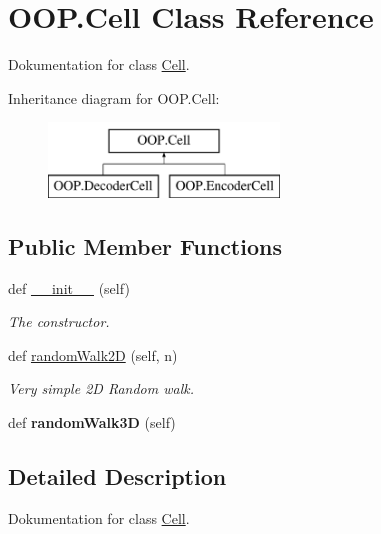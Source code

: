 \hypertarget{class_o_o_p_1_1_cell}{}\section{O\+O\+P.\+Cell Class Reference}
\label{class_o_o_p_1_1_cell}


Dokumentation for class \mbox{\hyperlink{class_o_o_p_1_1_cell}{Cell}}.  


Inheritance diagram for O\+O\+P.\+Cell\+:\begin{figure}[H]
\begin{center}
\leavevmode
\includegraphics[height=2.000000cm]{class_o_o_p_1_1_cell}
\end{center}
\end{figure}
\subsection*{Public Member Functions}
\begin{DoxyCompactItemize}
\item 
def \mbox{\hyperlink{class_o_o_p_1_1_cell_ab1a324a4456c36a49868ba26cd76eb39}{\+\_\+\+\_\+init\+\_\+\+\_\+}} (self)
\begin{DoxyCompactList}\small\item\em The constructor. \end{DoxyCompactList}\item 
def \mbox{\hyperlink{class_o_o_p_1_1_cell_a43bf87982f526ebdcf3334ab9d9038fd}{random\+Walk2D}} (self, n)
\begin{DoxyCompactList}\small\item\em Very simple 2D Random walk. \end{DoxyCompactList}\item 
\mbox{\label{class_o_o_p_1_1_cell_ade9b333c2663aed86972a68048c7abb4}} 
def {\bfseries random\+Walk3D} (self)
\end{DoxyCompactItemize}


\subsection{Detailed Description}
Dokumentation for class \mbox{\hyperlink{class_o_o_p_1_1_cell}{Cell}}. 


